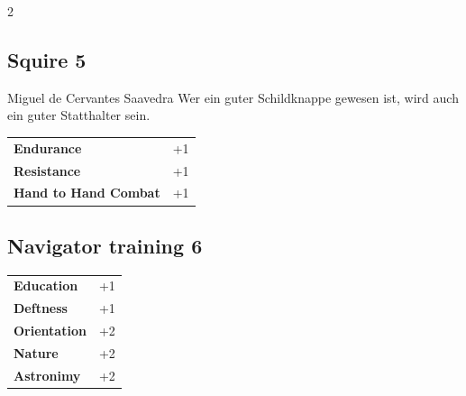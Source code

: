 \begin{multicols}{2}
\begin{tcolorbox}
    \subsection*{Squire \hfill \small{5 }}
    \tcblower


\begin{pquote}{Miguel de Cervantes Saavedra}
Wer ein guter Schildknappe gewesen ist, wird auch ein guter Statthalter sein.
\end{pquote}

\vspace{3mm}

\begin{tabular}{@{}ll@{}}
    \textbf{Endurance} & +1\\
    \textbf{Resistance} & +1\\
    \textbf{Hand to Hand Combat} & +1\\
\end{tabular}


\end{tcolorbox}

\begin{tcolorbox}
    \subsection*{Navigator training \hfill \small{6 }}
    \tcblower




\begin{tabular}{@{}ll@{}}
    \textbf{Education} & +1\\
    \textbf{Deftness} & +1\\
    \textbf{Orientation} & +2\\
    \textbf{Nature} & +2\\
    \textbf{Astronimy} & +2\\
\end{tabular}



\end{tcolorbox}
\end{multicols}
